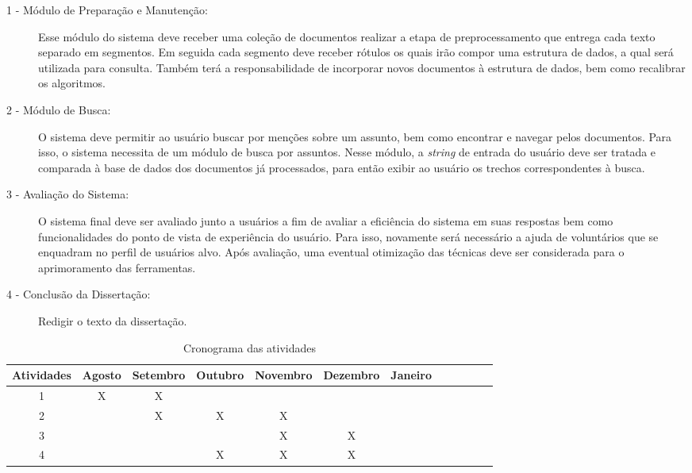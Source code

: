 \begin{description}

	\item[1 - Módulo de Preparação e Manutenção:] Esse módulo do sistema deve receber uma coleção de documentos realizar a etapa de  preprocessamento que entrega cada texto separado em segmentos. Em seguida cada segmento deve receber rótulos os quais irão compor uma estrutura de dados, a qual será utilizada para consulta.
%	
	Também terá a responsabilidade de incorporar novos documentos à estrutura de dados, bem como recalibrar os algoritmos.
	
		
	\item[2 - Módulo de Busca:] O sistema deve permitir ao usuário buscar por menções sobre um assunto, bem como encontrar e navegar pelos documentos. Para isso, o sistema necessita de um módulo de busca por assuntos. Nesse módulo, a \textit{string} de entrada do usuário deve ser tratada e comparada à base de dados dos documentos já processados, para então exibir ao usuário os trechos correspondentes à busca.

	
	
	\item[3 - Avaliação do Sistema:] O sistema final deve ser avaliado junto a usuários a fim de avaliar a eficiência do sistema em suas respostas bem como funcionalidades do ponto de vista de experiência do usuário. 
%
Para isso, novamente será necessário a ajuda de voluntários que se enquadram no perfil de usuários alvo.
%	
	Após avaliação, uma eventual otimização das técnicas deve ser considerada para o aprimoramento das ferramentas.
	
	
	\item[4 - Conclusão da Dissertação:] Redigir o texto da dissertação.
	
		

\end{description}



 \begin{center}
     \begin{longtable}{|c|c|c|c|c|c|c|c|c|c|c|c|}
     \caption{Cronograma das atividades}\label{table:cronograma}\\ \hline
   
     Atividades & 
     Agosto     & 
     Setembro   & 
     Outubro    & 
     Novembro   & 
     Dezembro   &
     Janeiro    
     \\ \hline
 	
     1  & X & X &   &   &   &   \\ \hline
     2  &   & X & X & X &   &   \\ \hline
     3  &   &   &   & X & X &   \\ \hline
     4  &   &   & X & X & X &   \\ \hline

     \end{longtable}
 \end{center}





